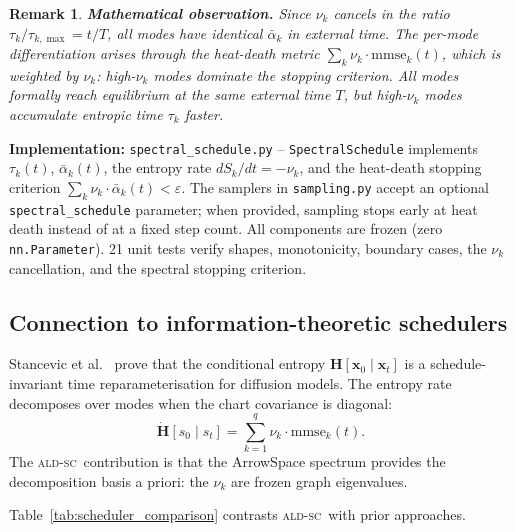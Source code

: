 \documentclass[11pt]{article}
\newtheorem{remark}{Remark}
\newcommand{\ALDSC}{\textsc{ald-sc}}
\begin{document}
    \begin{remark}
    \textbf{Mathematical observation.} Since $\nu_k$ cancels in the
    ratio $\tau_k / \tau_{k,\max} = t/T$, all modes have identical
    $\bar\alpha_k$ in external time. The per-mode differentiation
    arises through the \emph{heat-death metric} $\sum_k \nu_k \cdot
    \mathrm{mmse}_k(t)$, which is weighted by $\nu_k$: high-$\nu_k$
    modes dominate the stopping criterion. All modes formally reach
    equilibrium at the same external time $T$, but high-$\nu_k$ modes
    accumulate entropic time $\tau_k$ faster.
    \end{remark}

    \noindent\textbf{Implementation:} \texttt{spectral\_schedule.py} --
    \texttt{SpectralSchedule} implements $\tau_k(t)$, $\bar\alpha_k(t)$,
    the entropy rate $dS_k/dt = -\nu_k$, and the heat-death stopping
    criterion $\sum_k \nu_k \cdot \bar\alpha_k(t) < \varepsilon$.
    The samplers in \texttt{sampling.py} accept an optional
    \texttt{spectral\_schedule} parameter; when provided, sampling
    stops early at heat death instead of at a fixed step count. All
    components are frozen (zero \texttt{nn.Parameter}). 21 unit tests
    verify shapes, monotonicity, boundary cases, the $\nu_k$
    cancellation, and the spectral stopping criterion.

    \subsection{Connection to information-theoretic schedulers}
    \label{sec:stancevic}
    Stancevic et al.~\cite{Stancevic2025} prove that the conditional
    entropy $\mathbf{H}[\mathbf{x}_0 \mid \mathbf{x}_t]$ is a
    schedule-invariant time reparameterisation for diffusion models.
    The entropy rate decomposes over modes when the chart covariance
    is diagonal:
    \[\dot{\mathbf{H}}[s_0 \mid s_t] = \sum_{k=1}^{q} \nu_k \cdot
    \mathrm{mmse}_k(t).\]
    The \ALDSC~contribution is that the ArrowSpace spectrum provides
    the decomposition basis a priori: the $\nu_k$ are frozen graph
    eigenvalues.

    Table~\ref{tab:scheduler_comparison} contrasts \ALDSC~with prior
    approaches.
\end{document}
